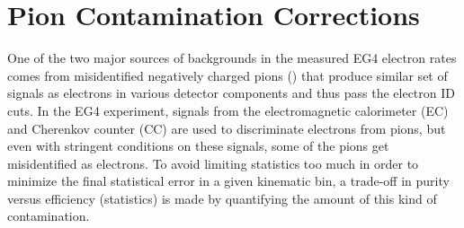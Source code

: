 \section{Pion Contamination Corrections}

One of the two major sources of backgrounds in the measured EG4 electron rates comes from misidentified negatively charged pions (\pim) that produce similar set of signals as electrons in various detector components and thus pass the electron ID cuts. In the EG4 experiment, signals from the electromagnetic calorimeter (EC) and Cherenkov counter (CC) are used to discriminate electrons from pions, but even with stringent conditions on these signals, some of the pions get misidentified as electrons. To avoid limiting statistics too much in order to minimize the final statistical error in a given kinematic bin, a trade-off in purity versus efficiency (statistics) is made by quantifying the amount of this kind of contamination.

